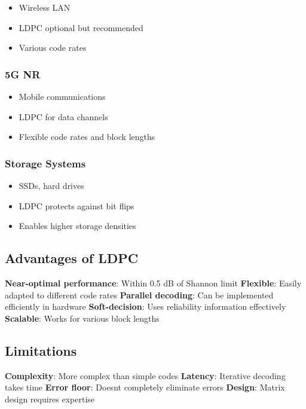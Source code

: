 \begin{itemize}
\tightlist
\item
  Wireless LAN
\item
  LDPC optional but recommended
\item
  Various code rates
\end{itemize}

\subsubsection{5G NR}\label{g-nr}

\begin{itemize}
\tightlist
\item
  Mobile communications
\item
  LDPC for data channels
\item
  Flexible code rates and block lengths
\end{itemize}

\subsubsection{Storage Systems}\label{storage-systems}

\begin{itemize}
\tightlist
\item
  SSDs, hard drives
\item
  LDPC protects against bit flips
\item
  Enables higher storage densities
\end{itemize}

\subsection{Advantages of LDPC}\label{advantages-of-ldpc}

\textbf{Near-optimal performance}: Within 0.5 dB of Shannon limit
\textbf{Flexible}: Easily adapted to different code rates
\textbf{Parallel decoding}: Can be implemented efficiently in hardware
\textbf{Soft-decision}: Uses reliability information effectively
\textbf{Scalable}: Works for various block lengths

\subsection{Limitations}\label{limitations}

\textbf{Complexity}: More complex than simple codes \textbf{Latency}:
Iterative decoding takes time \textbf{Error floor}:
Doesn\textquotesingle t completely eliminate errors \textbf{Design}:
Matrix design requires expertise

